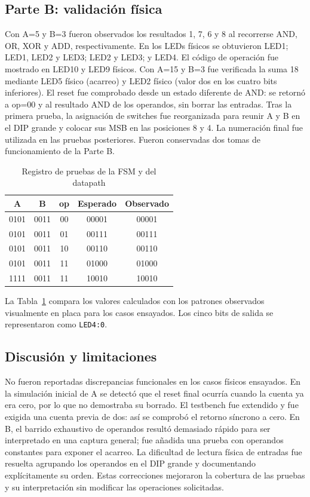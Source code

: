 \subsection{Parte B: validación física}
Con A=5 y B=3 fueron observados los resultados 1, 7, 6 y 8 al recorrerse AND, OR, XOR y ADD, respectivamente. En los LEDs físicos se obtuvieron LED1; LED1, LED2 y LED3; LED2 y LED3; y LED4. El código de operación fue mostrado en LED10 y LED9 físicos. Con A=15 y B=3 fue verificada la suma 18 mediante LED5 físico (acarreo) y LED2 físico (valor dos en los cuatro bits inferiores). El reset fue comprobado desde un estado diferente de AND: se retornó a op=00 y al resultado AND de los operandos, sin borrar las entradas. Tras la primera prueba, la asignación de switches fue reorganizada para reunir A y B en el DIP grande y colocar sus MSB en las posiciones 8 y 4. La numeración final fue utilizada en las pruebas posteriores. Fueron conservadas dos tomas de funcionamiento de la Parte B.

\begin{table}[!t]
\centering\caption{Registro de pruebas de la FSM y del datapath}\label{tab:pruebas}
\begin{tabular}{@{}ccccc@{}}\toprule
\textbf{A} & \textbf{B} & \textbf{op} & \textbf{Esperado} & \textbf{Observado}\\\midrule
0101 & 0011 & 00 & 00001 & 00001\\
0101 & 0011 & 01 & 00111 & 00111\\
0101 & 0011 & 10 & 00110 & 00110\\
0101 & 0011 & 11 & 01000 & 01000\\
1111 & 0011 & 11 & 10010 & 10010\\\bottomrule
\end{tabular}
\end{table}
La Tabla~\ref{tab:pruebas} compara los valores calculados con los patrones observados visualmente en placa para los casos ensayados. Los cinco bits de salida se representaron como \texttt{LED4:0}.

\subsection{Discusión y limitaciones}
No fueron reportadas discrepancias funcionales en los casos físicos ensayados. En la simulación inicial de A se detectó que el reset final ocurría cuando la cuenta ya era cero, por lo que no demostraba su borrado. El testbench fue extendido y fue exigida una cuenta previa de dos: así se comprobó el retorno síncrono a cero. En B, el barrido exhaustivo de operandos resultó demasiado rápido para ser interpretado en una captura general; fue añadida una prueba con operandos constantes para exponer el acarreo. La dificultad de lectura física de entradas fue resuelta agrupando los operandos en el DIP grande y documentando explícitamente su orden. Estas correcciones mejoraron la cobertura de las pruebas y su interpretación sin modificar las operaciones solicitadas.

